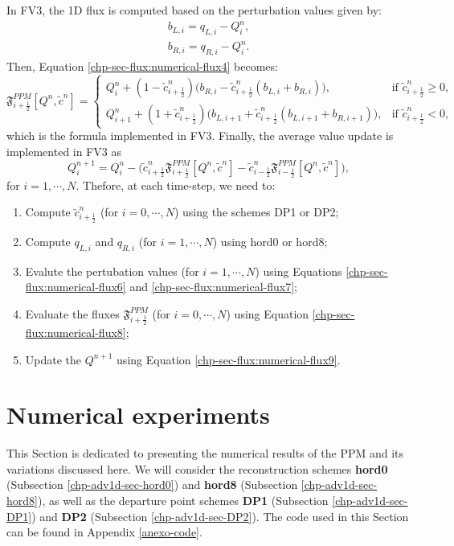 In FV3, the 1D flux is computed based on the perturbation values \citep{harris:2021} given by:
\begin{align}
\label{chp-sec-flux:numerical-flux6}
b_{L,i} = q_{L,i} - Q_i^n, \\
\label{chp-sec-flux:numerical-flux7}
b_{R,i} = q_{R,i} - Q_i^n.
\end{align}
Then, Equation \eqref{chp-sec-flux:numerical-flux4} becomes:
\begin{equation}
	\label{chp-sec-flux:numerical-flux8}
        \mathfrak{F}_{i+\frac{1}{2}}^{PPM}[Q^n,\tilde{c}^n]  =  
    	\begin{cases}
        Q_{i}^n +
        (1-\tilde{c}_{{i+\frac{1}{2}}}^n)
        \big(b_{R,i}-\tilde{c}_{{i+\frac{1}{2}}}^n
        (b_{L,i}+b_{R,i})\big),
	& \text{if } \tilde{c}_{i+\frac{1}{2}}^n \geq 0,\\
	Q_{i+1}^n +
        (1+\tilde{c}_{{i+\frac{1}{2}}}^n)
        \big(b_{L,i+1}+\tilde{c}_{{i+\frac{1}{2}}}^n
        (b_{L,i+1}+b_{R,i+1})\big),
	& \text{if } \tilde{c}_{i+\frac{1}{2}}^n<0,
    	\end{cases}
\end{equation}
which is the formula implemented in FV3.
Finally, the average value update is implemented in FV3 as
\begin{equation}
	\label{chp-sec-flux:numerical-flux9}
	Q_i^{n+1} = Q_i^{n} - 
        \big(\tilde{c}_{i+\frac{1}{2}}^n\mathfrak{F}_{i+\frac{1}{2}}^{PPM}[Q^n,\tilde{c}^n] -
        \tilde{c}_{i-\frac{1}{2}}^n\mathfrak{F}_{i-\frac{1}{2}}^{PPM}[Q^n,\tilde{c}^n]  \big),
\end{equation}
for $i=1, \cdots, N$.
Thefore, at each time-step, we need to:
\begin{enumerate}
\item Compute $\tilde{c}_{i+\frac{1}{2}}^n$ (for $i = 0, \cdots, N$) using the schemes DP1 or DP2;
\item Compute $q_{L,i}$ and  $q_{R,i}$ (for $i = 1, \cdots, N$) using hord0 or hord8;
\item Evalute the pertubation values (for $i = 1, \cdots, N$) using Equations
\eqref{chp-sec-flux:numerical-flux6} and \eqref{chp-sec-flux:numerical-flux7};
\item Evaluate the fluxes  $\mathfrak{F}_{i+\frac{1}{2}}^{PPM}$ (for $i = 0, \cdots, N$) using Equation \eqref{chp-sec-flux:numerical-flux8};
\item Update the $Q^{n+1}$ using Equation \eqref{chp-sec-flux:numerical-flux9}.
\end{enumerate}
\section{Numerical experiments}
\label{chp-adv1d-sec-numerical-exp}
This Section is dedicated to presenting the numerical results of the PPM and 
its variations discussed here. We will consider the reconstruction
schemes \textbf{hord0} (Subsection \ref{chp-adv1d-sec-hord0}) and 
\textbf{hord8} (Subsection \ref{chp-adv1d-sec-hord8}), as well as the departure point schemes
\textbf{DP1} (Subsection \ref{chp-adv1d-sec-DP1}) and \textbf{DP2} (Subsection \ref{chp-adv1d-sec-DP2}).
The code used in this Section can be found in Appendix \ref{anexo-code}.

